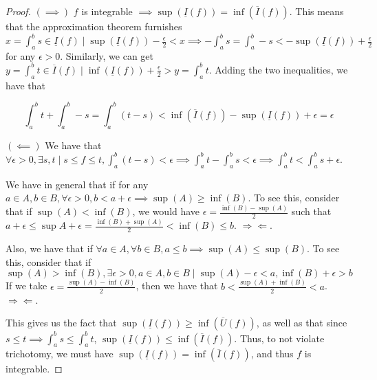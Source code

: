 \documentclass[12pt,letterpaper]{article}
\theoremstyle{definition}
\newcommand{\contra}{\Rightarrow\!\Leftarrow}
\begin{document}
\begin{proof}
  $(\implies)$ $f$ is integrable $\implies \sup(\underline{I}(f)) =
  \inf(\overline{I}(f))$. This means that the approximation theorem furnishes $x =
  \int_a^b s \in \underline{I}(f) \mid \sup(\underline{I}(f)) -
  \frac{\epsilon}{2} < x \implies -\int_a^bs = \int_a^b-s < -\sup(\underline{I}(f)) +
  \frac{\epsilon}{2}$ for any $\epsilon > 0$. Similarly, we can get $y = \int_a^b t \in
  \overline{I}(f) \mid \inf(\underline{I}(f)) + \frac{\epsilon}{2} > y =
  \int_a^b t$. Adding the two inequalities, we have that

  \[
    \int_a^b t + \int_a^b-s = \int_a^b (t - s) < \inf(\overline{I}(f)) -
    \sup(\underline{I}(f)) + \epsilon = \epsilon
  \]

  $(\impliedby)$
  We have that $\forall \epsilon > 0, \exists s,t \mid s \leq f \leq t,
  \int_a^b(t-s) < \epsilon \implies \int_a^b t - \int_a^bs < \epsilon \implies
  \int_a^bt < \int_a^bs + \epsilon$.

  We have in general that if for any $a \in A, b \in B, \forall \epsilon > 0, b < a +
  \epsilon \implies \sup(A) \geq \inf(B)$. To see this, consider that if
  $\sup(A) < \inf(B)$, we would have $\epsilon = \frac{\inf(B) - \sup(A)}{2}$
  such that $a + \epsilon \leq \sup{A} + \epsilon = \frac{\inf(B) + \sup(A)}{2}
  < \inf(B) \leq b$. $\contra$.

  Also, we have that if $\forall a \in A, \forall b \in B, a \leq b \implies
  \sup(A) \leq \sup(B)$. To see this, consider that if $\sup(A) > \inf(B),
  \exists \epsilon > 0, a \in A, b \in B \mid \sup(A) - \epsilon < a, \inf(B) +
  \epsilon > b$ If we take $\epsilon = \frac{\sup(A) - \inf(B)}{2}$, then we
  have that $b < \frac{\sup(A) + \inf(B)}{2} < a$. $\contra$.

  This gives us the fact that $\sup(\underline{I}(f)) \geq
  \inf(\overline{U}(f))$, as well as that since $s \leq t \implies \int_a^b s
  \leq \int_a^bt$, $\sup(\underline{I}(f)) \leq \inf(\overline{I}(f))$. Thus, to
  not violate trichotomy, we must have $\sup(\underline{I}(f)) =
  \inf(\overline{I}(f))$, and thus $f$ is integrable.
\end{proof}
\end{document}
